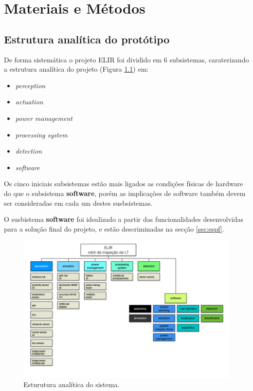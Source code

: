 \chapter{Materiais e Métodos}
\label{chap:mat}


\section{Estrutura analítica do protótipo}
\label{ssec:pbs}
De forma sistemática o projeto ELIR foi dividido em 6 subsistemas, caraterizando a estrutura analítica do projeto (Figura \ref{fig:pbselir}) em:

\begin{itemize}
	\item \textit{perception}
	\item \textit{actuation}
	\item \textit{power management}
	\item \textit{processing system}
	\item \textit{detection}
	\item \textit{software}
\end{itemize}

Os cinco iniciais subsistemas estão mais ligados as condições físicas de hardware do que o subsistema \textbf{software}, porém as implicações de software também devem ser consideradas em cada um destes susbsistemas.

O susbistema \textbf{software} foi idealizado a partir das funcionalidades desenvolvidas  para a solução final do projeto, e estão descriminadas na secção \ref{sec:espf}.

\begin{figure}[!htb]
	\centering
	\includegraphics[scale=0.6]{Figures/pbselir.png}
	\caption{Esturutura analítica do sistema.}
	\label{fig:pbselir}
\end{figure}

